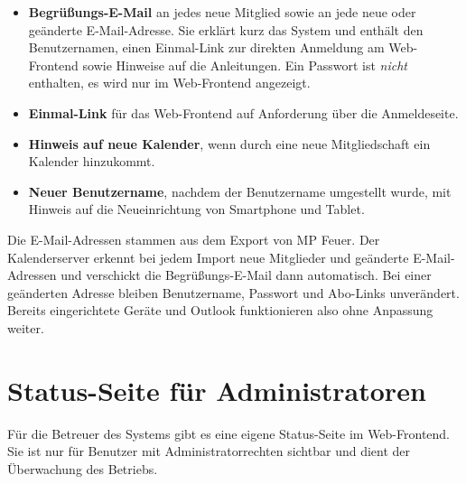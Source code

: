 \documentclass[a4paper,fontsize=10pt]{scrartcl}
\begin{document}
\begin{itemize}
  \item \textbf{Begrüßungs-E-Mail} an jedes neue Mitglied sowie an jede
        neue oder geänderte E-Mail-Adresse. Sie erklärt kurz das System und
        enthält den Benutzernamen, einen Einmal-Link zur direkten Anmeldung am
        Web-Frontend sowie Hinweise auf die Anleitungen. Ein Passwort ist
        \emph{nicht} enthalten, es wird nur im Web-Frontend angezeigt.
  \item \textbf{Einmal-Link} für das Web-Frontend auf Anforderung über die
        Anmeldeseite.
  \item \textbf{Hinweis auf neue Kalender}, wenn durch eine neue
        Mitgliedschaft ein Kalender hinzukommt.
  \item \textbf{Neuer Benutzername}, nachdem der Benutzername umgestellt
        wurde, mit Hinweis auf die Neueinrichtung von Smartphone und Tablet.
\end{itemize}

Die E-Mail-Adressen stammen aus dem Export von MP Feuer. Der Kalenderserver
erkennt bei jedem Import neue Mitglieder und geänderte E-Mail-Adressen und
verschickt die Begrüßungs-E-Mail dann automatisch. Bei einer geänderten Adresse
bleiben Benutzername, Passwort und Abo-Links unverändert. Bereits
eingerichtete Geräte und Outlook funktionieren also ohne Anpassung weiter.

\section{Status-Seite für Administratoren}\label{sec:admin}

Für die Betreuer des Systems gibt es eine eigene Status-Seite im
Web-Frontend. Sie ist nur für Benutzer mit Administratorrechten sichtbar und
dient der Überwachung des Betriebs.
\end{document}
